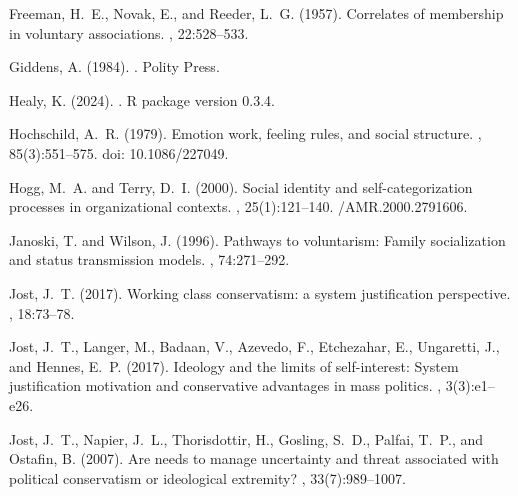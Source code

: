 \documentclass[12pt,letterpaper]{article}
\begin{document}
\begin{thebibliography}{}
Freeman, H.~E., Novak, E., and Reeder, L.~G. (1957).
\newblock Correlates of membership in voluntary associations.
, 22:528--533.

Giddens, A. (1984).
.
\newblock Polity Press.

Healy, K. (2024).
.
\newblock R package version 0.3.4.

Hochschild, A.~R. (1979).
\newblock Emotion work, feeling rules, and social structure.
, 85(3):551--575.
\newblock doi: 10.1086/227049.

Hogg, M.~A. and Terry, D.~I. (2000).
\newblock Social identity and self-categorization processes in organizational
  contexts.
,
  25(1):121--140.
/{AMR}.2000.2791606.

Janoski, T. and Wilson, J. (1996).
\newblock Pathways to voluntarism: Family socialization and status transmission
  models.
, 74:271--292.

Jost, J.~T. (2017).
\newblock Working class conservatism: a system justification perspective.
, 18:73--78.

Jost, J.~T., Langer, M., Badaan, V., Azevedo, F., Etchezahar, E., Ungaretti,
  J., and Hennes, E.~P. (2017).
\newblock Ideology and the limits of self-interest: System justification
  motivation and conservative advantages in mass politics.
, 3(3):e1--e26.

Jost, J.~T., Napier, J.~L., Thorisdottir, H., Gosling, S.~D., Palfai, T.~P.,
  and Ostafin, B. (2007).
\newblock Are needs to manage uncertainty and threat associated with political
  conservatism or ideological extremity?
, 33(7):989--1007.


\end{thebibliography}
\end{document}
